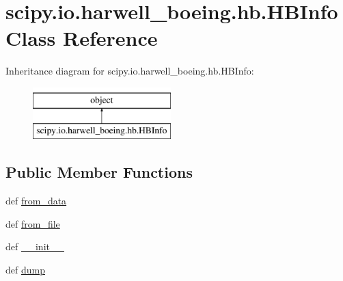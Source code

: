 \hypertarget{classscipy_1_1io_1_1harwell__boeing_1_1hb_1_1HBInfo}{}\section{scipy.\+io.\+harwell\+\_\+boeing.\+hb.\+H\+B\+Info Class Reference}
\label{classscipy_1_1io_1_1harwell__boeing_1_1hb_1_1HBInfo}
Inheritance diagram for scipy.\+io.\+harwell\+\_\+boeing.\+hb.\+H\+B\+Info\+:\begin{figure}[H]
\begin{center}
\leavevmode
\includegraphics[height=2.000000cm]{classscipy_1_1io_1_1harwell__boeing_1_1hb_1_1HBInfo}
\end{center}
\end{figure}
\subsection*{Public Member Functions}
\begin{DoxyCompactItemize}
\item 
def \hyperlink{classscipy_1_1io_1_1harwell__boeing_1_1hb_1_1HBInfo_ad3e3580ab7a1454db8f1a33292128ca7}{from\+\_\+data}
\item 
def \hyperlink{classscipy_1_1io_1_1harwell__boeing_1_1hb_1_1HBInfo_aae0b302763bf2f4d32aee17fab0f32d4}{from\+\_\+file}
\item 
def \hyperlink{classscipy_1_1io_1_1harwell__boeing_1_1hb_1_1HBInfo_a08e6ecf6f1871727dd0b874cb8691883}{\+\_\+\+\_\+init\+\_\+\+\_\+}
\item 
def \hyperlink{classscipy_1_1io_1_1harwell__boeing_1_1hb_1_1HBInfo_a3d4641579158a4e1db8222be94e0480c}{dump}
\end{DoxyCompactItemize}
